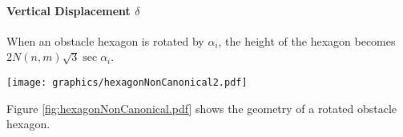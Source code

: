 \paragraph{Vertical Displacement $\delta$}

When an obstacle hexagon is rotated by $\alpha_i$, the height of the hexagon becomes $2 N(n,m) \sqrt{3} \sec \alpha_i$.

\begin{minipage}{\linewidth}
\begin{center}
\texttt{[image: graphics/hexagonNonCanonical2.pdf]}
\label{fig:hexagonNonCanonical.pdf}
\end{center}
\end{minipage}

Figure \ref{fig:hexagonNonCanonical.pdf} shows the geometry of a rotated obstacle hexagon.%



